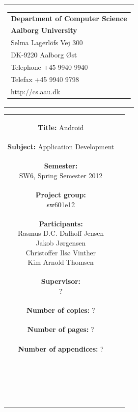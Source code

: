 \begin{nopagebreak}
\samepage 
\begin{tabular}{r}
\parbox{\textwidth}{
\hfill \parbox{6.2cm}{\begin{tabular}{l}
{\textsf\small \textbf{Department of Computer Science }}\\
{\textsf\small  \textbf{Aalborg University}}\\
{\textsf\small Selma Lagerlöfs Vej 300}\\
{\textsf\small DK-9220 Aalborg Øst}\\
{\textsf\small Telephone +45 9940 9940}\\
{\textsf\small Telefax +45 9940 9798}\\
{\textsf\small http://cs.aau.dk}
\end{tabular}}}
\end{tabular}

\begin{tabular}{cc}
\parbox{7cm}{
\textbf{Title:} 
Android\\ \\
\textbf{Subject:} 
Application Development \\ \\
\textbf{Semester:} \\
SW6, Spring Semester 2012\\ \\
\textbf{Project group:} \\
sw601e12\\ \\
\textbf{Participants:} \\
Rasmus D.C. Dalhoff-Jensen \\
Jakob J\o{}rgensen \\
Christoffer Ils\o{} Vinther \\
Kim Arnold Thomsen \\ \\
\textbf{Supervisor:} \\
?\\ \\
\textbf{Number of copies:}
? \\ \\
\textbf{Number of pages:}
? \\ \\
\textbf{Number of appendices:}
? \\ \\
\date{} \\ \\ \\
}


\end{tabular}
\end{nopagebreak}
